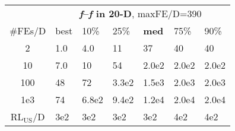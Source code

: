 \begin{tabular}{c|llllll}
 & \multicolumn{6}{|c}{\textbf{\textit{f}\raisebox{-0.35ex}{1}--\textit{f}\raisebox{-0.35ex}{24} in 20-D}, maxFE/D=390}\\
\#FEs/D & best & 10\% & 25\% & \textbf{med} & 75\% & 90\%\\
2 & \hspace*{1ex}1.0 & \hspace*{1ex}4.0 & 11 & 37 & 40 & 40\\
10 & \hspace*{1ex}7.0 & 10 & 54 & 2.0e2 & 2.0e2 & 2.0e2\\
100 & 48 & 72 & 3.3e2 & 1.5e3 & 2.0e3 & 2.0e3\\
1e3 & 74 & 6.8e2 & 9.4e2 & 1.2e4 & 2.0e4 & 2.0e4\\
$\text{RL}_{\text{US}}$/D & 3e2 & 3e2 & 3e2 & 3e2 & 4e2 & 4e2
\end{tabular}
